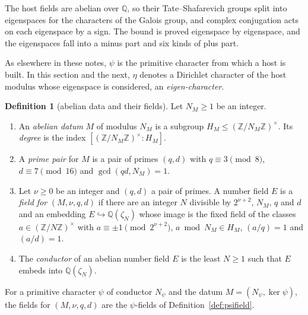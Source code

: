 \documentclass[11pt]{amsbook}
\theoremstyle{plain}
\theoremstyle{definition}
\newtheorem{definition}[theorem]{Definition}
\theoremstyle{remark}
\numberwithin{equation}{section}
\numberwithin{figure}{chapter}
\numberwithin{table}{chapter}
\newcommand{\Q}{\mathbb{Q}}
\newcommand{\Z}{\mathbb{Z}}
\begin{document}
The host fields are abelian over $\Q$, so their Tate--Shafarevich
groups split into eigenspaces for the characters of the Galois group,
and complex conjugation acts on each eigenspace by a sign. The bound is
proved eigenspace by eigenspace, and the eigenspaces fall into a minus
part and six kinds of plus part.

As elsewhere in these notes, $\psi$ is the primitive character from
which a host is built. In this section and the next, $\eta$ denotes
a Dirichlet character of the host modulus whose eigenspace is
considered, an \emph{eigen-character}.

\begin{definition}[abelian data and their fields]
\label{def:abelian-datum}
Let $N_M\ge1$ be an integer.
\begin{enumerate}[label=(\arabic*)]
\item An \emph{abelian datum} $M$ of modulus $N_M$ is a subgroup
$H_M\le(\Z/N_M\Z)^\times$. Its \emph{degree} is the index
$[(\Z/N_M\Z)^\times:H_M]$.
\item A \emph{prime pair} for $M$ is a pair of primes $(q,d)$ with
$q\equiv3\pmod8$, $d\equiv7\pmod{16}$ and $\gcd(qd,N_M)=1$.
\item Let $\nu\ge0$ be an integer and $(q,d)$ a pair of primes. A
number field $E$ is a \emph{field for} $(M,\nu,q,d)$ if there are an
integer $N$ divisible by $2^{\nu+2}$, $N_M$, $q$ and $d$ and an embedding
$E\hookrightarrow\Q(\zeta_N)$ whose image is the fixed field of the
classes $a\in(\Z/N\Z)^\times$ with $a\equiv\pm1\pmod{2^{\nu+2}}$,
$a\bmod N_M\in H_M$, $(a/q)=1$ and $(a/d)=1$.
\item The \emph{conductor} of an abelian number field $E$ is the least
$N\ge1$ such that $E$ embeds into $\Q(\zeta_N)$.
\end{enumerate}
\end{definition}

\noindent For a primitive character $\psi$ of conductor $N_\psi$ and the
datum $M=(N_\psi,\ker\psi)$, the fields for $(M,\nu,q,d)$ are the
$\psi$-fields of Definition~\ref{def:psifield}.
\end{document}
